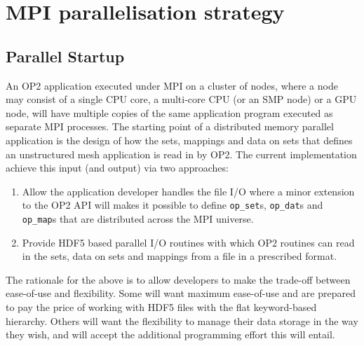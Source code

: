 \documentclass[11pt]{article}
\begin{document}
\section{MPI parallelisation strategy}
\subsection{Parallel Startup}\label{subsec/startup}
An OP2 application executed under MPI on a cluster of nodes, where a node may
consist of a single CPU core, a multi-core CPU (or an SMP node) or a GPU node,
will have multiple copies of the same application program executed as separate
MPI processes. The starting point of a distributed memory parallel application
is the design of how the sets, mappings and data on sets that defines an
unstructured mesh application is read in by OP2. The current implementation
achieve this input (and output) via two approaches:
\begin{enumerate}
\item Allow the application developer handles the file I/O where a minor
extension to the OP2 API will makes it possible to define \texttt{op\_set}s,
\texttt{op\_dat}s and \texttt{op\_map}s that are distributed across the MPI
universe.
\item Provide HDF5 based parallel I/O routines with which OP2 routines can
read in the sets, data on sets and mappings from a file in a prescribed format.
\end{enumerate}
The rationale for the above is to allow developers to make the trade-off between
ease-of-use and flexibility. Some will want maximum ease-of-use and are prepared
to pay the price of working with HDF5 files with the flat keyword-based
hierarchy. Others will want the flexibility to manage their data storage in
the way they wish, and will accept the additional programming effort this will entail.
\end{document}
